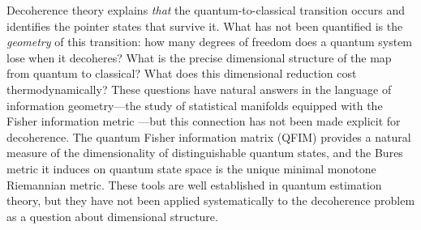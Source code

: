\documentclass[12pt,a4paper]{article}
\theoremstyle{definition}
\theoremstyle{remark}
\begin{document}
Decoherence theory explains \emph{that} the quantum-to-classical transition occurs and identifies the pointer states that survive it. What has not been quantified is the \emph{geometry} of this transition: how many degrees of freedom does a quantum system lose when it decoheres? What is the precise dimensional structure of the map from quantum to classical? What does this dimensional reduction cost thermodynamically? These questions have natural answers in the language of information geometry---the study of statistical manifolds equipped with the Fisher information metric \cite{rao1945information,chentsov1982statistical,amari1985differential}---but this connection has not been made explicit for decoherence. The quantum Fisher information matrix (QFIM) \cite{liu2020quantum,braunstein1994statistical} provides a natural measure of the dimensionality of distinguishable quantum states, and the Bures metric it induces on quantum state space \cite{bures1969extension,uhlmann1976transition,petz1996monotone} is the unique minimal monotone Riemannian metric. These tools are well established in quantum estimation theory, but they have not been applied systematically to the decoherence problem as a question about dimensional structure.
\end{document}
